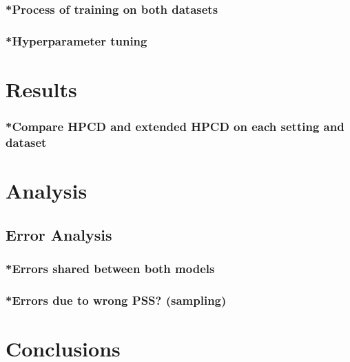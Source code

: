 \subsubsection{*Process of training on both datasets}
\subsubsection{*Hyperparameter tuning}

\section{Results}
\subsubsection{*Compare HPCD and extended HPCD on each setting and dataset}

\section{Analysis}
\subsection{Error Analysis}
\subsubsection{*Errors shared between both models}
\subsubsection{*Errors due to wrong PSS? (sampling)}

\section{Conclusions}
